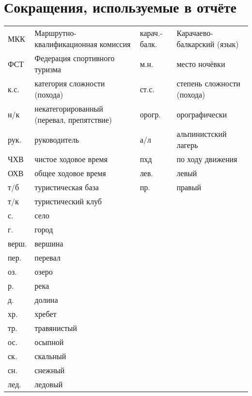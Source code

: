 \section*{Сокращения, используемые в отчёте}
\begin{table}[h!]
\centering
\begin{tabular}{p{} p{} | p{} p{}}
	МКК                                  &   Маршрутно-квалификационная комиссия  &	карач.-балк.	&	Карачаево-балкарский (язык)	\\
	ФСТ                                &   Федерация спортивного туризма  & м.н. & место ночёвки \\
	к.с.                               &   категория сложности (похода) & 
	ст.с.							& степень сложности (похода) \\
	н/к                            &   некатегорированный (перевал, препятствие) &	орогр.                &   орографически \\
	рук. &   руководитель &а/л                  &   альпинистский лагерь  \\
	ЧХВ                          &   чистое ходовое время  &пхд	&	по ходу движения \\
	ОХВ                          &   общее ходовое время  & лев.	& левый \\
	т/б                         &   туристическая база & пр. &   правый \\
	т/к                         &   туристический клуб &  &    \\
		с. & село & & \\
	г. & город & & \\
	верш.               &   вершина & & \\
	пер.               &   перевал & & \\
	оз.             &   озеро & & \\
	р.             &   река & & \\
	д.	&	долина & &\\
	хр. &   хребет& & \\
	тр. &   травянистый & &\\
	ос. &   осыпной& & \\
	ск. &   скальный & &\\
	сн. &   снежный & &\\
	лед. &   ледовый & &\\	
\end{tabular}
\end{table}
\clearpage